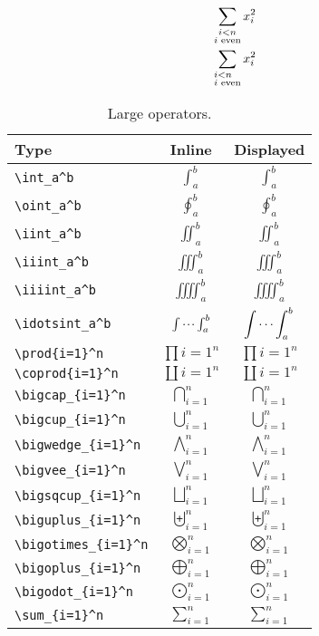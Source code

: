 \documentclass{amsart}
\numberwithin{equation}{section}
\begin{document}
\begin{align*}
    \sum_{\substack{i < n\\i \text{ even}}} x_i^2\\
    \sum_{\begin{subarray}{l}i < n\\i \text{ even}\end{subarray}} x_i^2
\end{align*}

\begin{table}[h]
    \renewcommand\arraystretch{1.75}
    \begin{center}
        \begin{tabular}{lcc}
            \hline
            Type &Inline &Displayed\\\hline
            \verb+\int_a^b+ &$\int_a^b$ &$\displaystyle \int_a^b$\\
            \verb+\oint_a^b+ &$\oint_a^b$ &$\displaystyle \oint_a^b$\\
            \verb+\iint_a^b+ &$\iint_a^b$ &$\displaystyle \iint_a^b$\\
            \verb+\iiint_a^b+ &$\iiint_a^b$ &$\displaystyle \iiint_a^b$\\
            \verb+\iiiint_a^b+ &$\iiiint_a^b$ &$\displaystyle \iiiint_a^b$\\
            \verb+\idotsint_a^b+ &$\idotsint_a^b$ &$\displaystyle \idotsint_a^b$\\
            \verb+\prod{i=1}^n+ &$\prod{i=1}^n$ &$\displaystyle \prod{i=1}^n$\\
            \verb+\coprod{i=1}^n+ &$\coprod{i=1}^n$ &$\displaystyle \coprod{i=1}^n$\\
            \verb+\bigcap_{i=1}^n+ &$\bigcap_{i=1}^n$ &$\displaystyle \bigcap_{i=1}^n$\\
            \verb+\bigcup_{i=1}^n+ &$\bigcup_{i=1}^n$ &$\displaystyle \bigcup_{i=1}^n$\\
            \verb+\bigwedge_{i=1}^n+ &$\bigwedge_{i=1}^n$ &$\displaystyle \bigwedge_{i=1}^n$\\
            \verb+\bigvee_{i=1}^n+ &$\bigvee_{i=1}^n$ &$\displaystyle \bigvee_{i=1}^n$\\
            \verb+\bigsqcup_{i=1}^n+ &$\bigsqcup_{i=1}^n$ &$\displaystyle \bigsqcup_{i=1}^n$\\
            \verb+\biguplus_{i=1}^n+ &$\biguplus_{i=1}^n$ &$\displaystyle \biguplus_{i=1}^n$\\
            \verb+\bigotimes_{i=1}^n+ &$\bigotimes_{i=1}^n$ &$\displaystyle \bigotimes_{i=1}^n$\\
            \verb+\bigoplus_{i=1}^n+ &$\bigoplus_{i=1}^n$ &$\displaystyle \bigoplus_{i=1}^n$\\
            \verb+\bigodot_{i=1}^n+ &$\bigodot_{i=1}^n$ &$\displaystyle \bigodot_{i=1}^n$\\
            \verb+\sum_{i=1}^n+ &$\sum_{i=1}^n$ &$\displaystyle \sum_{i=1}^n$\\
            \hline
        \end{tabular}
        \caption{Large operators.}
    \end{center}
\end{table}
\end{document}

